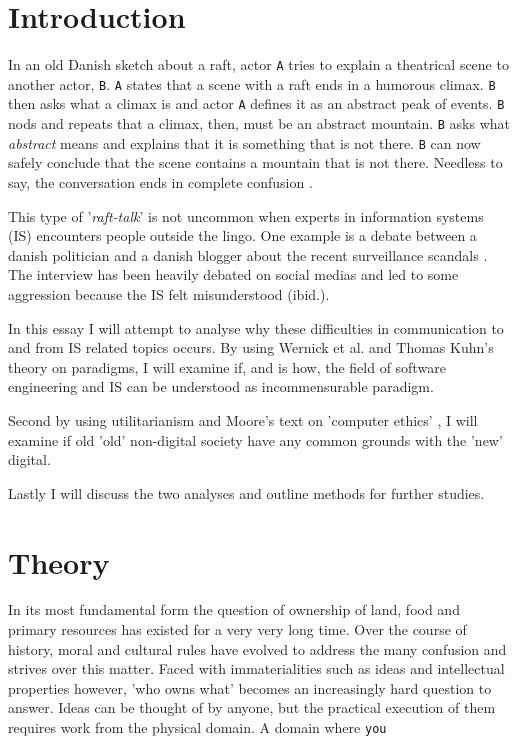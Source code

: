 \documentclass{article}
\begin{document}
\section{Introduction}
In an old Danish sketch about a raft, actor \texttt{A} tries to explain a theatrical scene to another actor, \texttt{B}. \texttt{A} states that a scene with a raft ends in a humorous climax. \texttt{B} then asks what a climax is and actor \texttt{A} defines it as an abstract peak of events. \texttt{B} nods and repeats that a climax, then, must be an abstract mountain. \texttt{B} asks what \textit{abstract} means and explains that it is something that is not there. \texttt{B} can now safely conclude that the scene contains a mountain that is not there. Needless to say, the conversation ends in complete confusion \citep{Raft:2014}.

This type of '\textit{raft-talk}' is not uncommon when experts in information systems (IS) encounters people outside the lingo. One example is a debate between a danish politician and a danish blogger about the recent surveillance scandals \citep{Bramsen:2014}. The interview has been heavily debated on social medias and led to some aggression because the IS felt misunderstood (ibid.).

In this essay I will attempt to analyse why these difficulties in communication to and from IS related topics occurs.
By using Wernick et al. and Thomas Kuhn's theory on paradigms, I will examine if, and is how, the field of software engineering and IS can be understood as incommensurable paradigm.

Second by using utilitarianism and Moore's text on 'computer ethics' \citep{Moore:1985}, I will examine if old 'old' non-digital society have any common grounds with the 'new' digital.

Lastly I will discuss the two analyses and outline methods for further studies.

\section{Theory}

In its most fundamental form the question of ownership of land, food and primary resources has existed for a
very very long time. Over the course of history, moral and cultural rules have evolved to address the
many confusion and strives over this matter. Faced with immaterialities such as
ideas and intellectual properties however, 'who owns what' becomes an increasingly hard question to answer. Ideas can be thought of by anyone, but the practical execution of them requires work from the physical domain. A domain where \texttt{you}
\end{document}
